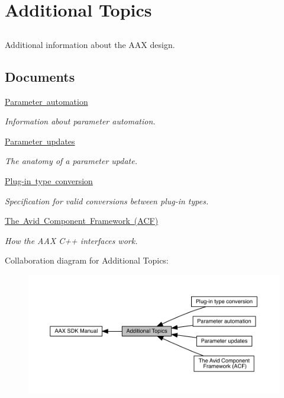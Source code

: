 \hypertarget{a00818}{}\section{Additional Topics}
\label{a00818}


\subsection{ }
Additional information about the A\+AX design. 

\subsection*{Documents}
\begin{DoxyCompactItemize}
\item 
\mbox{\hyperlink{a00819}{Parameter automation}}
\begin{DoxyCompactList}\small\item\em Information about parameter automation. \end{DoxyCompactList}\item 
\mbox{\hyperlink{a00820}{Parameter updates}}
\begin{DoxyCompactList}\small\item\em The anatomy of a parameter update. \end{DoxyCompactList}\item 
\mbox{\hyperlink{a00826}{Plug-\/in type conversion}}
\begin{DoxyCompactList}\small\item\em Specification for valid conversions between plug-\/in types. \end{DoxyCompactList}\item 
\mbox{\hyperlink{a00827}{The Avid Component Framework (\+A\+C\+F)}}
\begin{DoxyCompactList}\small\item\em How the A\+AX C++ interfaces work. \end{DoxyCompactList}\end{DoxyCompactItemize}
Collaboration diagram for Additional Topics\+:
\nopagebreak
\begin{figure}[H]
\begin{center}
\leavevmode
\includegraphics[width=350pt]{a00818}
\end{center}
\end{figure}
